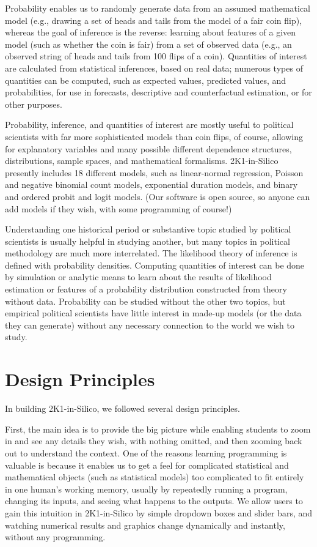 \documentclass[12pt]{article}
\theoremstyle{definition}
\begin{document}
Probability enables us to randomly generate data from an assumed mathematical model (e.g., drawing a set of heads and tails from the model of a fair coin flip), whereas the goal of inference is the reverse: learning about features of a given model (such as whether the coin is fair) from a set of observed data (e.g., an observed string of heads and tails from 100 flips of a coin). Quantities of interest are calculated from statistical inferences, based on real data; numerous types of quantities can be computed, such as expected values, predicted values, and probabilities, for use in forecasts, descriptive and counterfactual estimation, or for other purposes.

Probability, inference, and quantities of interest are mostly useful to political scientists with far more sophisticated models than coin flips, of course, allowing for explanatory variables and many possible different dependence structures, distributions, sample spaces, and mathematical formalisms.  2K1-in-Silico presently includes 18 different models, such as linear-normal regression, Poisson and negative binomial count models, exponential duration models, and binary and ordered probit and logit models. (Our software is open source, so anyone can add models if they wish, with some programming of course!)

Understanding one historical period or substantive topic studied by political scientists is usually helpful in studying another, but many topics in political methodology are much more interrelated.  The likelihood theory of inference is defined with probability densities. Computing quantities of interest can be done by simulation or analytic means to learn about the results of likelihood estimation or features of a probability distribution constructed from theory without data. Probability can be studied without the other two topics, but empirical political scientists have little interest in made-up models (or the data they can generate) without any necessary connection to the world we wish to study.

\section{Design Principles}

In building 2K1-in-Silico, we followed several design principles.

First, the main idea is to provide the big picture while enabling students to zoom in and see any details they wish, with nothing omitted, and then zooming back out to understand the context. One of the reasons learning programming is valuable is because it enables us to get a feel for complicated statistical and mathematical objects (such as statistical models) too complicated to fit entirely in one human's working memory, usually by repeatedly running a program, changing its inputs, and seeing what happens to the outputs. We allow users to gain this intuition in 2K1-in-Silico by simple dropdown boxes and slider bars, and watching numerical results and graphics change dynamically and instantly, without any programming.
\end{document}
